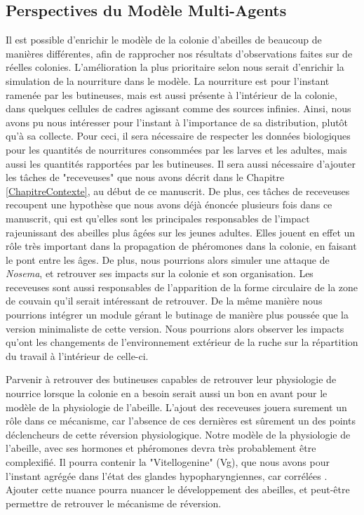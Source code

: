 	\subsection{Perspectives du Modèle Multi-Agents}
	Il est possible d'enrichir le modèle de la colonie d'abeilles de beaucoup de manières différentes, afin de rapprocher nos résultats d'observations faites sur de réelles colonies. L'amélioration la plus prioritaire selon nous serait d'enrichir la simulation de la nourriture dans le modèle. La nourriture est pour l'instant ramenée par les butineuses, mais est aussi présente à l'intérieur de la colonie, dans quelques cellules de cadres agissant comme des sources infinies. Ainsi, nous avons pu nous intéresser pour l'instant à l'importance de sa distribution, plutôt qu'à sa collecte. Pour ceci, il sera nécessaire de respecter les données biologiques pour les quantités de nourritures consommées par les larves et les adultes, mais aussi les quantités rapportées par les butineuses. Il sera aussi nécessaire d'ajouter les tâches de "receveuses" que nous avons décrit dans le Chapitre \ref{ChapitreContexte}, au début de ce manuscrit. De plus, ces tâches de receveuses recoupent une hypothèse que nous avons déjà énoncée plusieurs fois dans ce manuscrit, qui est qu'elles sont les principales responsables de l'impact rajeunissant des abeilles plus âgées sur les jeunes adultes. Elles jouent en effet un rôle très important dans la propagation de phéromones dans la colonie, en faisant le pont entre les âges. De plus, nous pourrions alors simuler une attaque de \textit{Nosema}, et retrouver ses impacts sur la colonie et son organisation. Les receveuses sont aussi responsables de l'apparition de la forme circulaire de la zone de couvain \cite{camazine_self-organizing_1991} qu'il serait intéressant de retrouver. De la même manière nous pourrions intégrer un module gérant le butinage de manière plus poussée que la version minimaliste de cette version. Nous pourrions alors observer les impacts qu'ont les changements de l'environnement extérieur de la ruche sur la répartition du travail à l'intérieur de celle-ci.
	
	Parvenir à retrouver des butineuses capables de retrouver leur physiologie de nourrice lorsque la colonie en a besoin serait aussi un bon en avant pour le modèle de la physiologie de l'abeille. L'ajout des receveuses jouera surement un rôle dans ce mécanisme, car l'absence de ces dernières est sûrement un des points déclencheurs de cette réversion physiologique. Notre modèle de la physiologie de l'abeille, avec ses hormones et phéromones devra très probablement être complexifié. Il pourra contenir la "Vitellogenine" (Vg), que nous avons pour l'instant agrégée dans l'état des glandes hypopharyngiennes, car corrélées \cite{johnson_division_2010}. Ajouter cette nuance pourra nuancer le développement des abeilles, et peut-être permettre de retrouver le mécanisme de réversion.
	
